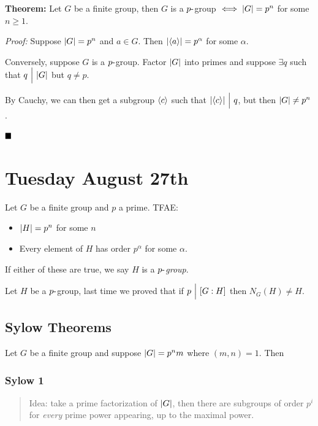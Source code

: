 \textbf{Theorem:} Let \(G\) be a finite group, then \(G\) is a
\(p{\hbox{-}}\)group \(\iff {\left\lvert {G} \right\rvert} = p^n\) for some \(n\geq 1\).

\emph{Proof:} Suppose \({\left\lvert {G} \right\rvert} = p^n\) and \(a \in G\). Then
\({\left\lvert {\left\langle{a}\right\rangle} \right\rvert} = p^\alpha\) for some \(\alpha\).

Conversely, suppose \(G\) is a \(p{\hbox{-}}\)group. Factor \({\left\lvert {G} \right\rvert}\) into
primes and suppose \(\exists q\) such that \(q {~\Bigm| ~} {\left\lvert {G} \right\rvert}\) but
\(q \neq p\).

By Cauchy, we can then get a subgroup \(\left\langle{c}\right\rangle\) such that
\({\left\lvert {\left\langle{c}\right\rangle} \right\rvert} {~\Bigm| ~} q\), but then \({\left\lvert {G} \right\rvert} \neq p^n\).

\(\qed\)

\hypertarget{tuesday-august-27th}{%
\section{Tuesday August 27th}\label{tuesday-august-27th}}

Let \(G\) be a finite group and \(p\) a prime. TFAE:

\begin{itemize}
\tightlist
\item
  \({\left\lvert {H} \right\rvert} = p^n\) for some \(n\)
\item
  Every element of \(H\) has order \(p^\alpha\) for some \(\alpha\).
\end{itemize}

If either of these are true, we say \(H\) is a \emph{\(p{\hbox{-}}\)group}.

Let \(H\) be a \(p{\hbox{-}}\)group, last time we proved that if
\(p {~\Bigm| ~} [G : H]\) then \(N_G(H) \neq H\).

\hypertarget{sylow-theorems}{%
\subsection{Sylow Theorems}\label{sylow-theorems}}

Let \(G\) be a finite group and suppose \({\left\lvert {G} \right\rvert} = p^n m\) where
\((m, n) = 1\). Then

\hypertarget{sylow-1}{%
\subsubsection{Sylow 1}\label{sylow-1}}

\begin{quote}
Idea: take a prime factorization of \({\left\lvert {G} \right\rvert}\), then there are
subgroups of order \(p^i\) for \emph{every} prime power appearing, up to
the maximal power.
\end{quote}

